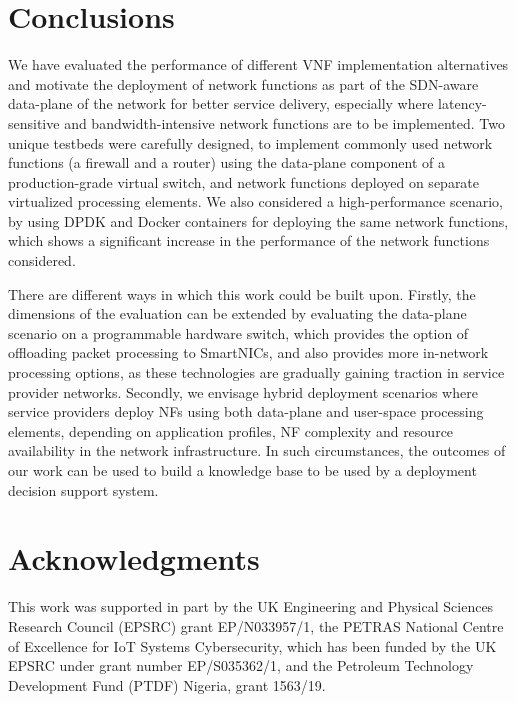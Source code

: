 \documentclass[conference]{IEEEtran}
\begin{document}
\section{Conclusions}
\label{conclusion}
We have evaluated the performance of different VNF implementation alternatives and motivate the deployment of network functions as part of the SDN-aware data-plane of the network for better service delivery, especially where latency-sensitive and bandwidth-intensive network functions are to be implemented. Two unique testbeds were carefully designed, to implement commonly used network functions (a firewall and a router) using the data-plane component of a production-grade virtual switch, and network functions deployed on separate virtualized processing elements. We also considered a high-performance scenario, by using DPDK and Docker containers for deploying the same network functions, which shows a significant increase in the performance of the network functions considered.

There are different ways in which this work could be built upon. Firstly, the dimensions of the evaluation can be extended by evaluating the data-plane scenario on a programmable hardware switch, which provides the option of offloading packet processing to SmartNICs, and also provides more in-network processing options, as these technologies are gradually gaining traction in service provider networks.
Secondly, we envisage hybrid deployment scenarios where service providers deploy NFs using both data-plane and user-space processing elements, depending on application profiles, NF complexity and resource availability in the network infrastructure. In such circumstances, the outcomes of our work can be used to build a knowledge base to be used by a deployment decision support system. 

\section*{Acknowledgments}
{This  work  was  supported  in  part  by  the  UK  Engineering and  Physical  Sciences  Research  Council  (EPSRC)  grant EP/N033957/1, the PETRAS National Centre of Excellence for IoT Systems Cybersecurity, which has been funded by the UK EPSRC under grant number EP/S035362/1, and the Petroleum Technology Development Fund (PTDF) Nigeria, grant 1563/19.}

\balance


\end{document}
